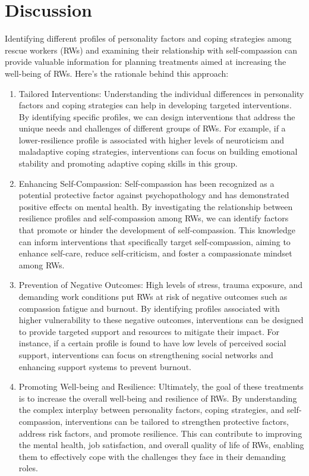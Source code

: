 \documentclass[
  man]{apa6}
\begin{document}
\hypertarget{discussion}{%
\section{Discussion}\label{discussion}}

Identifying different profiles of personality factors and coping strategies among rescue workers (RWs) and examining their relationship with self-compassion can provide valuable information for planning treatments aimed at increasing the well-being of RWs. Here's the rationale behind this approach:

\begin{enumerate}
\def\labelenumi{\arabic{enumi}.}
\item
  Tailored Interventions: Understanding the individual differences in personality factors and coping strategies can help in developing targeted interventions. By identifying specific profiles, we can design interventions that address the unique needs and challenges of different groups of RWs. For example, if a lower-resilience profile is associated with higher levels of neuroticism and maladaptive coping strategies, interventions can focus on building emotional stability and promoting adaptive coping skills in this group.
\item
  Enhancing Self-Compassion: Self-compassion has been recognized as a potential protective factor against psychopathology and has demonstrated positive effects on mental health. By investigating the relationship between resilience profiles and self-compassion among RWs, we can identify factors that promote or hinder the development of self-compassion. This knowledge can inform interventions that specifically target self-compassion, aiming to enhance self-care, reduce self-criticism, and foster a compassionate mindset among RWs.
\item
  Prevention of Negative Outcomes: High levels of stress, trauma exposure, and demanding work conditions put RWs at risk of negative outcomes such as compassion fatigue and burnout. By identifying profiles associated with higher vulnerability to these negative outcomes, interventions can be designed to provide targeted support and resources to mitigate their impact. For instance, if a certain profile is found to have low levels of perceived social support, interventions can focus on strengthening social networks and enhancing support systems to prevent burnout.
\item
  Promoting Well-being and Resilience: Ultimately, the goal of these treatments is to increase the overall well-being and resilience of RWs. By understanding the complex interplay between personality factors, coping strategies, and self-compassion, interventions can be tailored to strengthen protective factors, address risk factors, and promote resilience. This can contribute to improving the mental health, job satisfaction, and overall quality of life of RWs, enabling them to effectively cope with the challenges they face in their demanding roles.
\end{enumerate}
\end{document}
